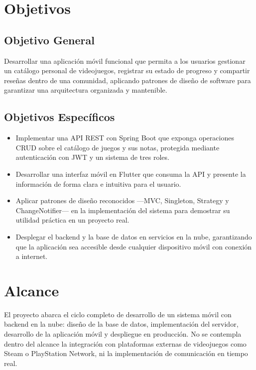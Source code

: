 \section{Objetivos}

\subsection{Objetivo General}

Desarrollar una aplicación móvil funcional que permita a los usuarios gestionar
un catálogo personal de videojuegos, registrar su estado de progreso y compartir
reseñas dentro de una comunidad, aplicando patrones de diseño de software para
garantizar una arquitectura organizada y mantenible.

\subsection{Objetivos Específicos}

\begin{itemize}
    \item Implementar una API REST con Spring Boot que exponga operaciones
    CRUD sobre el catálogo de juegos y sus notas, protegida mediante
    autenticación con JWT y un sistema de tres roles.

    \item Desarrollar una interfaz móvil en Flutter que consuma la API y
    presente la información de forma clara e intuitiva para el usuario.

    \item Aplicar patrones de diseño reconocidos —MVC, Singleton, Strategy
    y ChangeNotifier— en la implementación del sistema para demostrar su
    utilidad práctica en un proyecto real.

    \item Desplegar el backend y la base de datos en servicios en la nube,
    garantizando que la aplicación sea accesible desde cualquier dispositivo
    móvil con conexión a internet.
\end{itemize}

\section{Alcance}

El proyecto abarca el ciclo completo de desarrollo de un sistema móvil con
backend en la nube: diseño de la base de datos, implementación del servidor,
desarrollo de la aplicación móvil y despliegue en producción. No se contempla
dentro del alcance la integración con plataformas externas de videojuegos como
Steam o PlayStation Network, ni la implementación de comunicación en tiempo real.